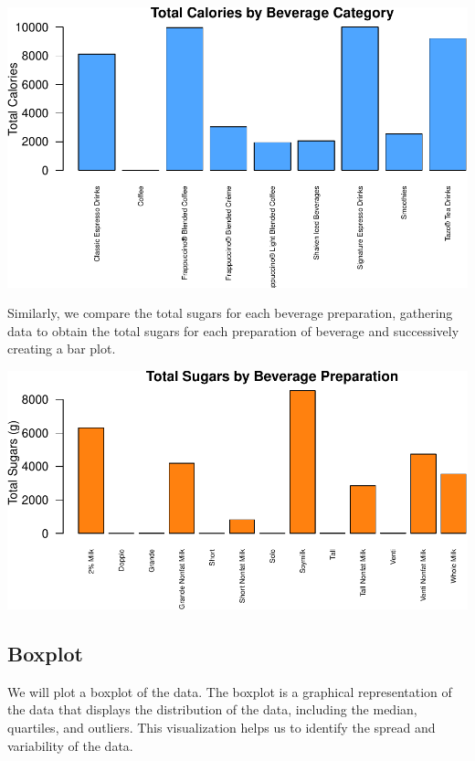 \documentclass[
]{article}
\begin{document}
\begin{center}\includegraphics{Statistical_Learning_Final_Report_files/figure-latex/total_calories-1} \end{center}

Similarly, we compare the total sugars for each beverage preparation,
gathering data to obtain the total sugars for each preparation of
beverage and successively creating a bar plot.

\begin{center}\includegraphics{Statistical_Learning_Final_Report_files/figure-latex/total_sugars-1} \end{center}

\subsection{Boxplot}\label{boxplot}

We will plot a boxplot of the data. The boxplot is a graphical
representation of the data that displays the distribution of the data,
including the median, quartiles, and outliers. This visualization helps
us to identify the spread and variability of the data.
\end{document}
